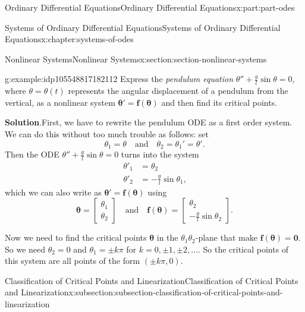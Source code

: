\documentclass[twoside,10pt,]{book}
\newcommand{\blocktitlefont}{\relax}
\numberwithin{equation}{part}
\renewcommand{\vec}[1]{\mathbf{#1}}
\newcommand{\vecm}[1]{\bm{#1}}
\renewcommand{\vecm}[1]{\boldsymbol{#1}}
\newcommand{\amp}{&}
\begin{document}
\begin{partptx}{Ordinary Differential Equations}{}{Ordinary Differential Equations}{}{}{x:part:part-odes}
\begin{chapterptx}{Systems of Ordinary Differential Equations}{}{Systems of Ordinary Differential Equations}{}{}{x:chapter:systems-of-odes}
\begin{sectionptx}{Nonlinear Systems}{}{Nonlinear Systems}{}{}{x:section:section-nonlinear-systems}
\begin{introduction}{}
\begin{example}{}{g:example:idp105548817182112}
Express the \emph{pendulum equation} \(\theta''+\frac{g}{l}\sin\theta=0\), where \(\theta=\theta(t)\) represents the angular displacement of a pendulum from the vertical, as a nonlinear system \(\vecm{\theta}' = \vec{f}(\vecm{\theta})\) and then find its critical points.%
\par\smallskip%
\noindent\textbf{\blocktitlefont Solution}.\hypertarget{g:solution:idp105548817184160}{}\quad{}First, we have to rewrite the pendulum ODE as a first order system. We can do this without too much trouble as follows: set%
\begin{equation*}
\theta_{1} = \theta\quad\text{and}\quad\theta_{2} = \theta_{1}' = \theta'\text{.}
\end{equation*}
Then the ODE \(\theta''+\frac{g}{l}\sin\theta = 0\) turns into the system%
\begin{align*}
\theta'_{1} \amp = \theta_{2}\\
\theta'_{2} \amp = -\frac{g}{l}\sin\theta_{1}\text{,}
\end{align*}
which we can also write as \(\boldsymbol{\theta}' = \vec{f}(\boldsymbol{\theta})\) using%
\begin{equation*}
\vecm{\theta} = \begin{bmatrix}\theta_{1} \\ \theta_{2}\end{bmatrix}\quad\text{and}\quad \vec{f}(\vecm{\theta}) = \begin{bmatrix}\theta_{2} \\ -\frac{g}{l}\sin\theta_{2}\end{bmatrix}.
\end{equation*}
%
\par
Now we need to find the critical points \(\vecm{\theta}\) in the \(\theta_{1}\theta_{2}\)-plane that make \(\vec{f}(\vecm{\theta}) = \vec{0}\). So we need \(\theta_{2} = 0\) and \(\theta_{1} = \pm k\pi\) for \(k=0,\pm1,\pm2,\dots\). So the critical points of this system are all points of the form \((\pm k\pi,0)\).%
\end{example}
\end{introduction}%
%
%
\typeout{************************************************}
\typeout{************************************************}
%
\begin{subsectionptx}{Classification of Critical Points and Linearization}{}{Classification of Critical Points and Linearization}{}{}{x:subsection:subsection-classification-of-critical-points-and-linearization}

\end{subsectionptx}
\end{sectionptx}
\end{chapterptx}
\end{partptx}
\end{document}
